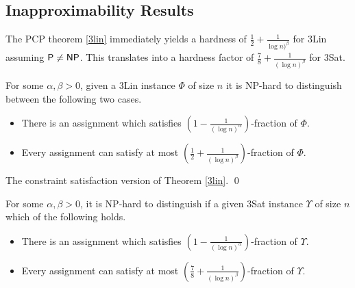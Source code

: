 \subsection{Inapproximability Results}

The PCP theorem \ref{3lin} immediately yields a hardness of $\frac{1}{2} +
\frac{1}{\log n)^\beta}$ for {\sc 3Lin} assuming ${\sf P \ne NP}$. This
translates into a hardness factor of
$\frac{7}{8} + \frac{1}{(\log n)^\beta}$ for {\sc 3Sat}.\\

\begin{corollary}
  For some $\alpha, \beta > 0$, given a {\sc 3Lin} instance $\Phi$ of
  size $n$ it is {\sf NP}-hard to distinguish between the following
  two cases.
\begin{itemize}
\item There is an assignment which satisfies $(1 - \frac{1}{(\log n)^\alpha})$-fraction of $\Phi$.
\item Every assignment can satisfy at most $(\frac{1}{2} + \frac{1}{(\log
      n)^{\beta}})$-fraction of $\Phi$.
\end{itemize}
\end{corollary}
 The constraint satisfaction version of Theorem
\ref{3lin}. \qed \\

\begin{corollary}
  For some $\alpha, \beta > 0$, it is {\sf NP}-hard to distinguish if a given 
{\sc 3Sat} instance $\Upsilon$  of size $n$ which of the following holds.
\begin{itemize}
\item There is an assignment which satisfies $(1 -
    \frac{1}{(\log n)^\alpha})$-fraction of $\Upsilon$.
\item Every assignment can satisfy at most $(\frac{7}{8} + \frac{1}{(\log n)^{\beta}})$-fraction of $\Upsilon$.
\end{itemize}
\end{corollary}

